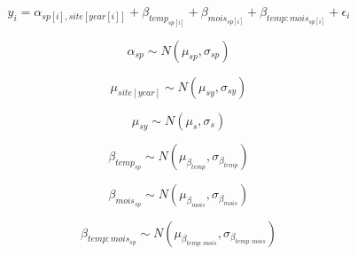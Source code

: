 \documentclass{article}
\begin{document}
\begin{equation}
y_{i}=\alpha_{sp[i],site[year[i]]} + \beta_{temp_{sp[i]}}+ \beta_{mois_{sp[i]}} + \beta_{temp:mois_{sp[i]}}+\epsilon_{i}\label{eq:8}
\end{equation}

\begin{equation}
\alpha_{sp}\sim N(\mu_{sp}, \sigma_{sp})
\end{equation}

\begin{equation}
\mu_{site[year]} \sim N(\mu_{sy}, \sigma_{sy})
\end{equation}

\begin{equation}
\mu_{sy} \sim N(\mu_{s}, \sigma_{s})
\end{equation}

\begin{equation}
\beta_{temp_{sp}} \sim N(\mu_{\beta_{temp}}, \sigma_{\beta_{temp}})
\end{equation}

\begin{equation}
\beta_{mois_{sp}} \sim N(\mu_{\beta_{mois}}, \sigma_{\beta_{mois}})
\end{equation}

\begin{equation}
\beta_{temp:mois_{sp}} \sim N(\mu_{\beta_{temp:mois}}, \sigma_{\beta_{temp:mois}})
\end{equation}
\end{document}
